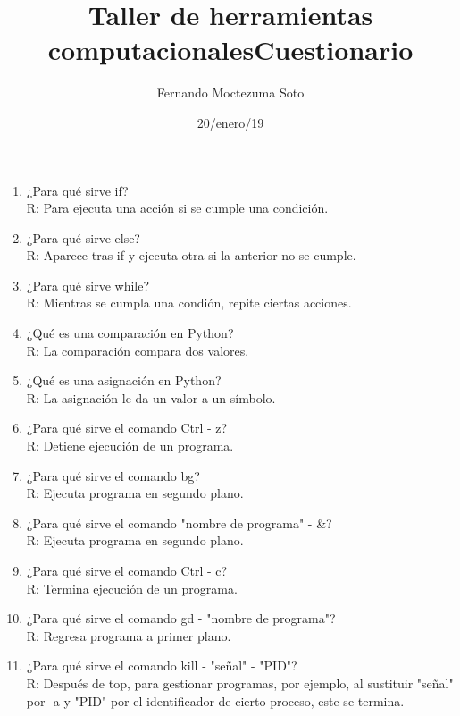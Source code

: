\documentclass[etterpaper, 12pt, oneside]{article}%
\title{\Huge Taller de herramientas computacionales}
\author{Fernando Moctezuma Soto}
\date{20/enero/19}
\begin{document}
	\maketitle
	
	\newpage
	
	\title{\Huge Cuestionario\\}

	\begin{enumerate}
		\item ¿Para qué sirve if?
		\\R: Para ejecuta una acción si se cumple una condición.
		
		\item ¿Para qué sirve else?
		\\R: Aparece tras if y ejecuta otra si la anterior no se cumple.
		
		\item ¿Para qué sirve while?
		\\R: Mientras se cumpla una condión, repite ciertas acciones.
		
		\item ¿Qué es una comparación en Python?
		\\R: La comparación compara dos valores.
		
		\item ¿Qué es una asignación en Python?
		\\R: La asignación le da un valor a un símbolo.
		
		\item ¿Para qué sirve el comando Ctrl - z?
		\\R: Detiene ejecución de un programa.
		
		\item ¿Para qué sirve el comando bg?
		\\R: Ejecuta programa en segundo plano.
		
		\item ¿Para qué sirve el comando "nombre de programa" - \&?
		\\R: Ejecuta programa en segundo plano.
		
		\item ¿Para qué sirve el comando Ctrl - c?
		\\R: Termina ejecución de un programa.
		
		\item ¿Para qué sirve el comando gd - "nombre de programa"?
		\\R: Regresa programa a primer plano.
		
		\item ¿Para qué sirve el comando kill - "señal" - "PID"?
		\\R: Después de top, para gestionar programas, por ejemplo, al sustituir "señal" por -a y "PID" por el identificador de cierto proceso, este se termina.
		

\end{enumerate}
\end{document}
